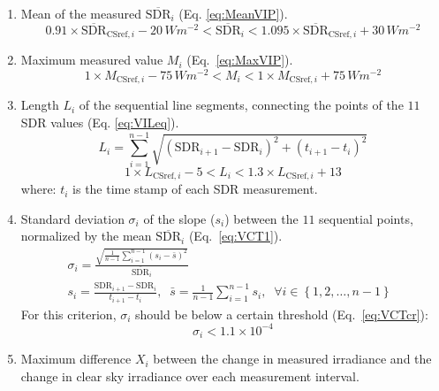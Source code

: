 \documentclass[
  preprint, 3p, authoryear]{article}
\providecommand{\tightlist}{%
  \setlength{\itemsep}{0pt}\setlength{\parskip}{0pt}}
\begin{document}
\begin{enumerate}
\def\labelenumi{\alph{enumi})}
\tightlist
\item
  Mean of the measured \(\overline{\text{SDR}}_i\) (Eq. \ref{eq:MeanVIP}).
  \begin{equation}
  0.91 \times \overline{\text{SDR}}_{\text{CSref},i} - 20\,Wm^{-2}
  < \overline{\text{SDR}}_i <
  1.095 \times \overline{\text{SDR}}_{\text{CSref},i} + 30\,Wm^{-2}
  \label{eq:MeanVIP}
  \end{equation}
\item
  Maximum measured value \(M_{i}\) (Eq.~\ref{eq:MaxVIP}).
  \begin{equation}
  1 \times M_{\text{CSref},i} - 75\,Wm^{-2}
  < M_{i} <
  1 \times M_{\text{CSref},i} + 75\,Wm^{-2}
  \label{eq:MaxVIP}
  \end{equation}
\item
  Length \(L_i\) of the sequential line segments, connecting the points of the \(11\) SDR values (Eq. \ref{eq:VILeq}).
  \begin{equation}
  L_i = \sum_{i=1}^{n-1}\sqrt{\left ( \text{SDR}_{i+1} - \text{SDR}_{i}\right )^2 + \left ( t_{i+1} - t_i \right )^2}
  \label{eq:VILeq}
  \end{equation}
  \begin{equation}
  1 \times L_{\text{CSref},i} - 5 < L_i < 1.3 \times L_{\text{CSref},i} + 13
  \label{eq:VILcr}
  \end{equation}
  where: \(t_i\) is the time stamp of each SDR measurement.
\item
  Standard deviation \(\sigma_i\) of the slope (\(s_i\)) between the \(11\) sequential points, normalized by the mean \(\overline{\text{SDR}}_i\) (Eq.~\ref{eq:VCT1}).
  \begin{gather}
    \sigma_i = \frac {\sqrt{\frac{1}{n-1} \sum_{i=1}^{n-1} \left( s_i - \bar{s} \right)^2}} {\overline{\text{SDR}}_i} \label{eq:VCT1} \\
    s_i = \frac{\text{SDR}_{i+1} - \text{SDR}_{i}}{t_{i+1} - t_i},\;\;   \bar{s} = \frac{1}{n-1} \sum_{i=1}^{n-1} s_i,\;\;\forall i \in \left \{ 1, 2, \ldots, n-1 \right \}\;\;
  \end{gather}
  For this criterion, \(\sigma_i\) should be below a certain threshold (Eq.~\ref{eq:VCTcr}):
  \begin{equation}
    \sigma_i < \ensuremath{1.1\times 10^{-4}} \label{eq:VCTcr}
  \end{equation}
\item
  Maximum difference \(X_i\) between the change in measured irradiance and the change in clear sky irradiance over each measurement interval.

\end{enumerate}
\end{document}
